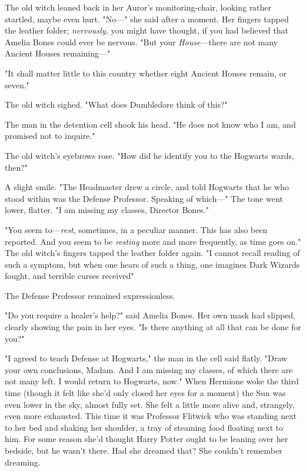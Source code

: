 The old witch leaned back in her Auror's monitoring-chair, looking rather
startled, maybe even hurt. "No\mbox{---}" she said after a moment. Her fingers tapped
the leather folder; \emph{nervously,} you might have thought, if you had
believed that Amelia Bones could ever be nervous. "But your
\emph{House}---there are not many Ancient Houses remaining\mbox{---}"

"It shall matter little to this country whether eight Ancient Houses remain, or
seven."

The old witch sighed. "What does Dumbledore think of this?"

The man in the detention cell shook his head. "He does not know who I am, and
promised not to inquire."

The old witch's eyebrows rose. "How did he identify you to the Hogwarts wards,
then?"

A slight smile. "The Headmaster drew a circle, and told Hogwarts that he who
stood within was the Defense Professor. Speaking of which\mbox{---}" The tone went
lower, flatter. "I am missing my classes, Director Bones."

"You seem to---\emph{rest}, sometimes, in a peculiar manner. This has also been
reported. And you seem to be \emph{resting} more and more frequently, as time
goes on." The old witch's fingers tapped the leather folder again. "I cannot
recall reading of such a symptom, but when one hears of such a thing, one
imagines{\el} Dark Wizards fought, and terrible curses received{\el}"

The Defense Professor remained expressionless.

"Do you require a healer's help?" said Amelia Bones. Her own mask had slipped,
clearly showing the pain in her eyes. "Is there anything at all that can be
done for you?"

"I agreed to teach Defense at Hogwarts," the man in the cell said flatly. "Draw
your own conclusions, Madam. And I am missing my classes, of which there are
not many left. I would return to Hogwarts, now."
\sbreak
When Hermione woke the third time (though it felt like she'd only closed her
eyes for a moment) the Sun was even lower in the sky, almost fully set. She
felt a little more alive and, strangely, even more exhausted. This time it was
Professor Flitwick who was standing next to her bed and shaking her shoulder, a
tray of steaming food floating next to him. For some reason she'd thought Harry
Potter ought to be leaning over her bedside, but he wasn't there. Had she
dreamed that? She couldn't remember dreaming.

